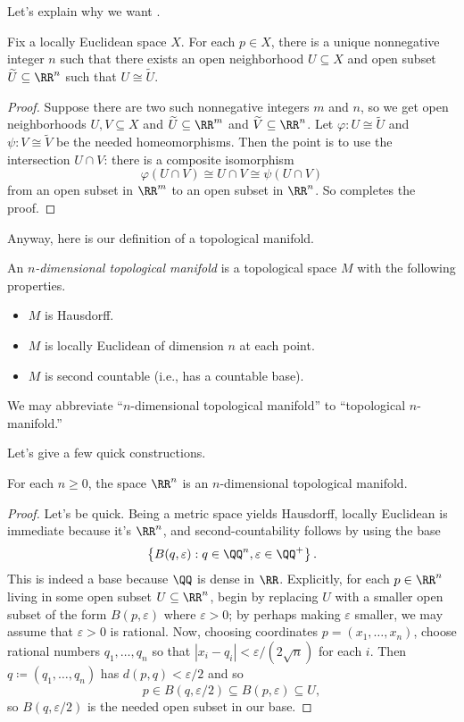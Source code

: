 \documentclass[../notes.tex]{subfiles}
\begin{document}
Let's explain why we want .
\begin{lemma}
	Fix a locally Euclidean space $X$. For each $p\in X$, there is a unique nonnegative integer $n$ such that there exists an open neighborhood $U\subseteq X$ and open subset $\widetilde U\subseteq\RR^n$ such that $U\cong\widetilde U$.
\end{lemma}
\begin{proof}
	Suppose there are two such nonnegative integers $m$ and $n$, so we get open neighborhoods $U,V\subseteq X$ and $\widetilde U\subseteq\RR^m$ and $\widetilde V\subseteq\RR^n$. Let $\varphi\colon U\cong\widetilde U$ and $\psi\colon V\cong\widetilde V$ be the needed homeomorphisms. Then the point is to use the intersection $U\cap V$: there is a composite isomorphism
	\[\varphi(U\cap V)\cong U\cap V\cong\psi(U\cap V)\]
	from an open subset in $\RR^m$ to an open subset in $\RR^n$. So  completes the proof.
\end{proof}
Anyway, here is our definition of a topological manifold.
\begin{definition}
	An \textit{$n$-dimensional topological manifold} is a topological space $M$ with the following properties.
	\begin{itemize}
		\item $M$ is Hausdorff.
		\item $M$ is locally Euclidean of dimension $n$ at each point.
		\item $M$ is second countable (i.e., has a countable base).
	\end{itemize}
	We may abbreviate ``$n$-dimensional topological manifold'' to ``topological $n$-manifold.''
\end{definition}
Let's give a few quick constructions.
\begin{lemma} \label{lem:rn-manifold}
	For each $n\ge0$, the space $\RR^n$ is an $n$-dimensional topological manifold.
\end{lemma}
\begin{proof}
	Let's be quick. Being a metric space yields Hausdorff, locally Euclidean is immediate because it's $\RR^n$, and second-countability follows by using the base
	\[\left\{B(q,\varepsilon):q\in\QQ^n,\varepsilon\in\QQ^+\right\}.\]
	This is indeed a base because $\QQ$ is dense in $\RR$. Explicitly, for each $p\in\RR^n$ living in some open subset $U\subseteq\RR^n$, begin by replacing $U$ with a smaller open subset of the form $B(p,\varepsilon)$ where $\varepsilon>0$; by perhaps making $\varepsilon$ smaller, we may assume that $\varepsilon>0$ is rational. Now, choosing coordinates $p=(x_1,\ldots,x_n)$, choose rational numbers $q_1,\ldots,q_n$ so that $\left|x_i-q_i\right|<\varepsilon/(2\sqrt n)$ for each $i$. Then $q\coloneqq(q_1,\ldots,q_n)$ has $d(p,q)<\varepsilon/2$ and so
	\[p\in B(q,\varepsilon/2)\subseteq B(p,\varepsilon)\subseteq U,\]
	so $B(q,\varepsilon/2)$ is the needed open subset in our base.
\end{proof}
\end{document}
